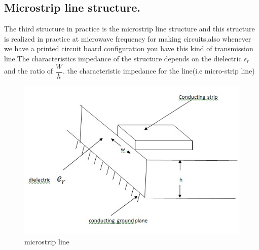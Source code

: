 \subsection{Microstrip line structure.}
The third structure in practice is the microstrip line structure and this  structure is realized in practice at microwave frequency for making circuits,also whenever we have a printed circuit board configuration you have this kind of transmission line.The characteristics impedance of the structure depends on the dielectric $\epsilon_{r}$ and the ratio of $\dfrac{W}{h}$. the characteristic impedance for the line(i.e micro-strip line)
\begin{figure}[h]
\centering
\includegraphics[width=1\linewidth]{./graphics/microstrip}
\caption{microstrip line}
\end{figure}

